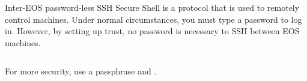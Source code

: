 \begin{block}{Inter-EOS password-less SSH}
  Secure Shell is a protocol that is used to remotely control machines. Under normal circumstances, you must type a password to log in. However, by setting up trust, no password is necessary to SSH between EOS machines.
  \begin{indented}
    {\scriptsize \inputminted[tabsize=2,frame=single]{bash}{../common/ssh.bash}}
  \end{indented}
  For more security, use a passphrase and .
\end{block}

